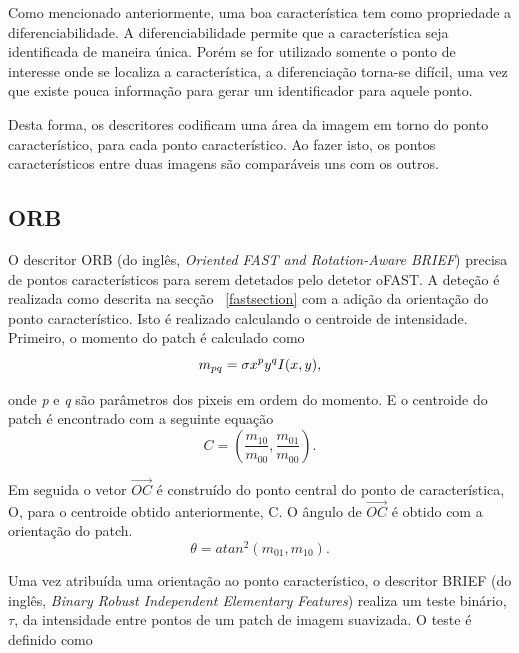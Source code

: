 Como mencionado anteriormente, uma boa característica tem como propriedade a diferenciabilidade. A diferenciabilidade permite que a característica seja identificada de maneira única. Porém se for utilizado somente o ponto de interesse onde se localiza a característica, a diferenciação torna-se difícil, uma vez que existe pouca informação para gerar um identificador para aquele ponto.

Desta forma, os descritores codificam uma área da imagem em torno do ponto característico, para cada ponto característico. Ao fazer isto, os pontos característicos entre duas imagens são comparáveis uns com os outros.


\subsection{ORB}

O descritor ORB (do inglês, \textit{Oriented FAST and Rotation-Aware BRIEF}) precisa de pontos característicos para serem detetados pelo detetor oFAST. A deteção é realizada como descrita na secção ~\ref{fastsection} com a adição da orientação do ponto característico. Isto é realizado calculando o centroide de intensidade. Primeiro, o momento do patch é calculado como 
\begin{equation}\label{equacao2.5.1.1}
 \textit{$m_{pq}$} = \sigma \textit{$ x^py^qI$}(x,y),
\end{equation}

onde \textit{p} e \textit{q} são parâmetros dos pixeis em ordem do momento. E o centroide do patch é encontrado com a seguinte equação 
\begin{equation}\label{equacao2.5.1.2}
 C = ( \frac{ \textit{m}_{10} }{ \textit{m}_{00}},  \frac{ \textit{m}_{01} }{ \textit{m}_{00}} ) . 
\end{equation}

Em seguida o vetor $\vec{OC}$ é construído do ponto central do ponto de característica, O, para o centroide obtido anteriormente, C. O ângulo de $\vec{OC}$ é obtido com a orientação do patch. 
\begin{equation}\label{equacao2.5.1.3}
	\theta = atan^2( \textit{m}_{01},\textit{m}_{10}) .
\end{equation} 

Uma vez atribuída uma orientação ao ponto característico, o descritor BRIEF (do inglês, \textit{Binary Robust Independent Elementary Features}) realiza um teste binário, $\tau$, da intensidade entre pontos de um patch de imagem suavizada. O teste é definido como  

